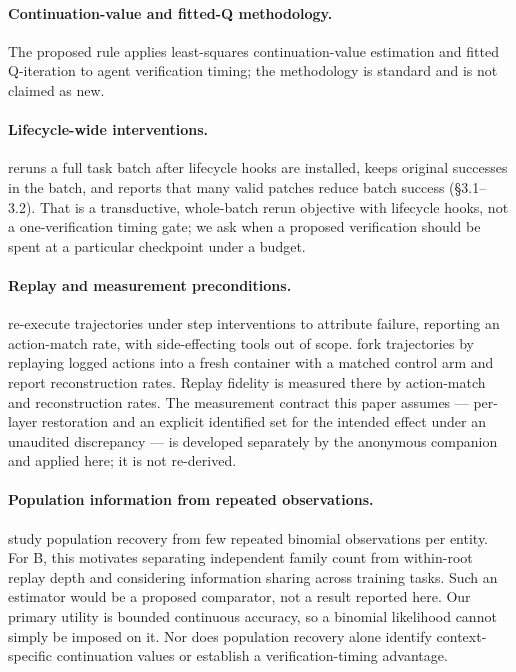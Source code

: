 \paragraph{Continuation-value and fitted-Q methodology.}
The proposed rule applies least-squares continuation-value estimation
\citep{longstaffschwartz2001} and fitted Q-iteration \citep{ernst2005} to agent
verification timing; the methodology is standard and is not claimed as new.

\paragraph{Lifecycle-wide interventions.}
 reruns a full task batch after lifecycle hooks are
installed, keeps original successes in the batch, and reports that many valid
patches reduce batch success (\S3.1--3.2).  That is a transductive, whole-batch
rerun objective with lifecycle hooks, not a one-verification timing gate; we ask
when a proposed verification should be spent at a particular checkpoint under a
budget.

\paragraph{Replay and measurement preconditions.}
 re-execute trajectories under step interventions to
attribute failure, reporting an action-match rate, with side-effecting tools out
of scope.   fork trajectories by replaying logged actions
into a fresh container with a matched control arm and report reconstruction
rates.  Replay fidelity is measured there by action-match and reconstruction
rates.  The measurement contract this paper assumes --- per-layer restoration
and an explicit identified set for the intended effect under an unaudited
discrepancy --- is developed separately by the anonymous companion and applied
here; it is not re-derived.

\paragraph{Population information from repeated observations.}
\citet{tian2017populations} study population recovery from few repeated
binomial observations per entity. For B, this motivates separating independent
family count from within-root replay depth and considering information sharing
across training tasks. Such an estimator would be a proposed comparator, not a
result reported here. Our primary utility is bounded continuous accuracy, so a
binomial likelihood cannot simply be imposed on it. Nor does population
recovery alone identify context-specific continuation values or establish a
verification-timing advantage.


